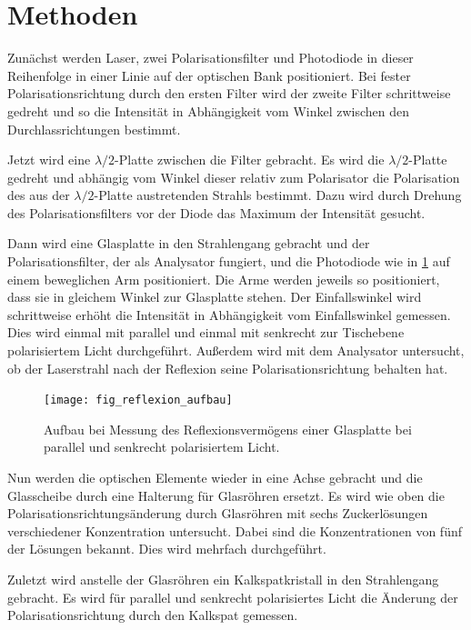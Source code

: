 \documentclass[
	a4paper,
	12pt,
	pagesize,
	ngerman
]{scrartcl}
\begin{document}
	\section{Methoden}
	Zunächst werden Laser, zwei Polarisationsfilter und Photodiode in dieser Reihenfolge in einer Linie auf der optischen Bank positioniert.
	Bei fester Polarisationsrichtung durch den ersten Filter wird der zweite Filter schrittweise gedreht und so die Intensität in Abhängigkeit vom Winkel zwischen den Durchlassrichtungen bestimmt.
	
	Jetzt wird eine $\lambda /2$-Platte zwischen die Filter gebracht.
	Es wird die $\lambda /2$-Platte gedreht und abhängig vom Winkel dieser relativ zum Polarisator die Polarisation des aus der $\lambda /2$-Platte austretenden Strahls bestimmt.
	Dazu wird durch Drehung des Polarisationsfilters vor der Diode das Maximum der Intensität gesucht.
	
	Dann wird eine Glasplatte in den Strahlengang gebracht und der Polarisationsfilter, der als Analysator fungiert, und die Photodiode wie in \cref{fig_reflexion_aufbau} auf einem beweglichen Arm positioniert.
	Die Arme werden jeweils so positioniert, dass sie in gleichem Winkel zur Glasplatte stehen.
	Der Einfallswinkel wird schrittweise erhöht die Intensität in Abhängigkeit vom Einfallswinkel gemessen.
	Dies wird einmal mit parallel und einmal mit senkrecht zur Tischebene polarisiertem Licht durchgeführt.
	Außerdem wird mit dem Analysator untersucht, ob der Laserstrahl nach der Reflexion seine Polarisationsrichtung behalten hat.
	
	\begin{figure}[H] 
		\texttt{[image: fig\_reflexion\_aufbau]}
		\centering
		\caption{Aufbau bei Messung des Reflexionsvermögens einer Glasplatte bei parallel und senkrecht polarisiertem Licht. \cite{aufbau_reflexion}} 
		\label{fig_reflexion_aufbau}
		\centering
	\end{figure}
	
	Nun werden die optischen Elemente wieder in eine Achse gebracht und die Glasscheibe durch eine Halterung für Glasröhren ersetzt.
	Es wird wie oben die Polarisationsrichtungsänderung durch Glasröhren mit sechs Zuckerlösungen verschiedener Konzentration untersucht.
	Dabei sind die Konzentrationen von fünf der Lösungen bekannt.
	Dies wird mehrfach durchgeführt.
	
	Zuletzt wird anstelle der Glasröhren ein Kalkspatkristall in den Strahlengang gebracht.
	Es wird für parallel und senkrecht polarisiertes Licht die Änderung der Polarisationsrichtung durch den Kalkspat gemessen.
	
\end{document}

